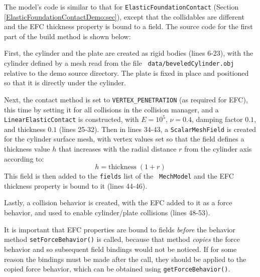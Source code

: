 The model's code is similar to that for {\tt ElasticFoundationContact}
(Section \ref{ElasticFoundationContactDemo:sec}), except that the
collidables are different and the EFC {\sf thickness} property
is bound to a field. The source code for the first part of the build
method is shown below:

\lstset{numbers=left} 
\iflatexml

\else

\fi
\lstset{numbers=none}

First, the cylinder and the plate are created as rigid bodies (lines
6-23), with the cylinder defined by a mesh read from the file {\tt
data/beveledCylinder.obj} relative to the demo source directory.  The
plate is fixed in place and positioned so that it is directly under
the cylinder.

Next, the contact method is set to {\tt VERTEX\_PENETRATION} (as
required for EFC), this time by setting it for all collisions in the
collision manager, and a {\tt LinearElasticContact} is constructed,
with $E = 10^5$, $\nu=0.4$, damping factor $0.1$, and thickness $0.1$
(lines 25-32). Then in lines 34-43, a {\tt ScalarMeshField} is created
for the cylinder surface mesh, with vertex values set so that the
field defines a thickness value $h$ that increases with the radial
distance $r$ from the cylinder axis according to:
%
\begin{equation*}
h = \text{thickness}\; (1+r)
\end{equation*}
%
This field is then added to the {\tt fields} list of the {\tt
MechModel} and the EFC {\sf thickness} property is bound to it
(lines 44-46).

Lastly, a collision behavior is created, with the EFC added to it as a
force behavior, and used to enable cylinder/plate collisions (lines
48-53).

\begin{sideblock}
It is important that EFC properties are bound to fields {\it before}
the behavior method {\tt setForceBehavior()} is called, because that
method {\it copies} the force behavior and so subsequent field
bindings would not be noticed. If for some reason the bindings must be
made after the call, they should be applied to the copied force
behavior, which can be obtained using {\tt getForceBehavior()}.
\end{sideblock}

